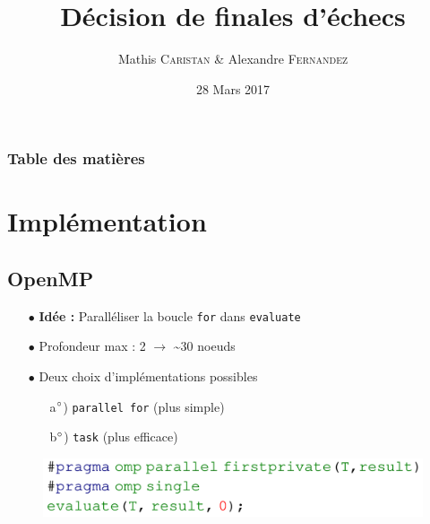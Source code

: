 \documentclass[usepdftitle=false,green]{beamer}
\title[Projet HPC]{\textbf{Décision de finales d'échecs}}
\author[M. Caristan \& A. Fernandez]{Mathis \textsc{Caristan} \& Alexandre \textsc{Fernandez}}
\institute[]{\textsc{UPMC}}
\date{28 Mars 2017}
\newcommand{\nologo}{\setbeamertemplate{logo}{}} %
\begin{document}
{\nologo
\begin{frame}
\titlepage
\end{frame}
}

 \begin{frame}
 \frametitle{Table des matières}
\begin{center}
\begin{varwidth}{\textwidth}
\tableofcontents[sectionstyle=show,subsectionstyle=hide] 
\end{varwidth}
\end{center}
 \end{frame}
 
\section{Implémentation}
	\subsection{OpenMP}
\begin{frame}
        \begin{center}
        \begin{itemize}
            \item[$\bullet$] \textbf{Idée : } Paralléliser la boucle \texttt{for} dans \texttt{evaluate}
            \item[$\bullet$] Profondeur max : 2 $\longrightarrow$ \textasciitilde 30 noeuds
            \item[$\bullet$] Deux choix d'implémentations possibles
                \begin{itemize}
                    \item[a$\degree$)] \texttt{parallel for} (plus simple)
                    \item[b$\degree$)] \texttt{task} (plus efficace)
            \end{itemize}
        \end{itemize}
            \begin{figure}
                \includegraphics[scale=0.2]{pics/code1.png}
            \end{figure}
        \end{center}
\end{frame}
\end{document}
